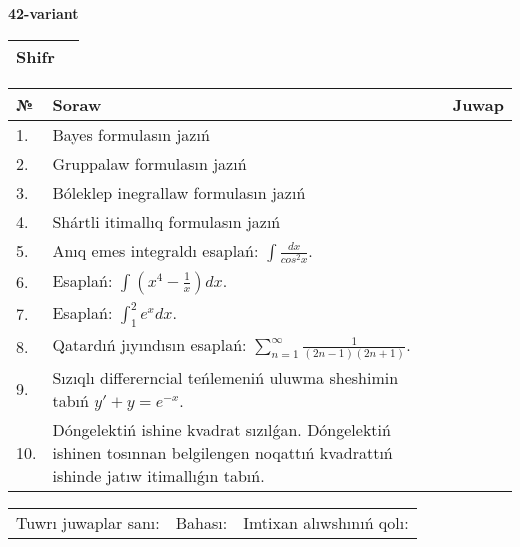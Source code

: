 \documentclass{article}
\begin{document}
  \egroup
  
  \newpage
  
  
  \textbf{42-variant}\\
  
  \bgroup
  \def\arraystretch{1.6} %
  
  \begin{tabular}{|m{5.7cm}|m{9.5cm}|}
  \hline
  Shifr & \\
  \hline
  \end{tabular}
  
  \vspace{1cm}
  
  \begin{tabular}{|m{0.7cm}|m{10cm}|m{4cm}|}
  \hline
  № & Soraw & Juwap \\
  \hline
  1. & Bayes formulasın jazıń &  \\
  \hline
  2. & Gruppalaw formulasın jazıń &  \\
  \hline
  3. & Bóleklep inegrallaw formulasın jazıń &  \\
  \hline
  4. & Shártli itimallıq formulasın jazıń &  \\
  \hline
  5. & Anıq emes integraldı esaplań: \(\int\frac{dx}{cos^2 x}\). &  \\
  \hline
  6. & Esaplań: \(\int\left( x^{4} - \frac{1}{x} \right)dx\). &  \\
  \hline
  7. & Esaplań: \(\int_{1}^2 {e^{x}dx}\). &  \\
  \hline
  8. & Qatardıń jıyındısın esaplań: \(\sum_{n = 1}^{\infty}\frac{1}{(2n - 1)(2n + 1)}\). &  \\
  \hline
  9. & Sızıqlı differerncial teńlemeniń uluwma sheshimin tabıń \(y' + y = e^{- x}\). &  \\
  \hline
  10. & Dóngelektiń ishine kvadrat sızılǵan. Dóngelektiń ishinen tosınnan belgilengen noqattıń kvadrattıń ishinde jatıw itimallıǵın tabıń. &  \\
  \hline
  \end{tabular}
  
  \vspace{1cm}
  
  \begin{tabular}{lll}
  Tuwrı juwaplar sanı: \underline{\hspace{1.5cm}} & 
  Bahası: \underline{\hspace{1.5cm}} & 
  Imtixan alıwshınıń qolı: \underline{\hspace{2cm}} \\
  \end{tabular}
  
\end{document}
